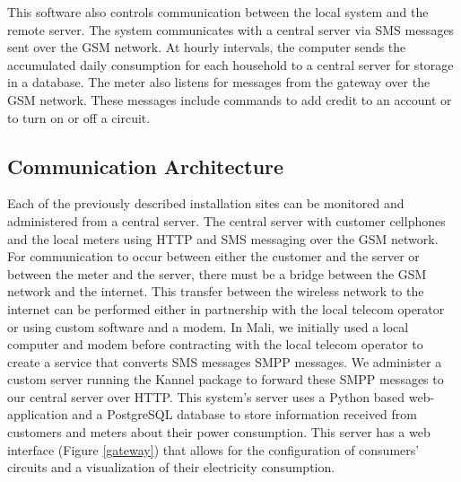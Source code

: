 \documentclass{sig-alternate}
\begin{document}
This software also controls communication between the local system and
the remote server.
The system communicates with a central server via SMS messages sent over
the GSM network.
At hourly intervals, the computer sends the accumulated daily
consumption for each household to a central server for storage in a
database.
The meter also listens for messages from the gateway over the GSM network.
These messages include commands to add credit to an account or to turn
on or off a circuit.

\subsection{Communication Architecture}
Each of the previously described installation sites can be monitored and
administered from a central server.
The central server with customer cellphones and the
local meters using HTTP and SMS messaging over the GSM
network.
For communication to occur between either the customer and the server
or between the meter and the server, there must be a bridge between
the GSM network and the internet.
This transfer between the wireless network to the internet can be
performed either in partnership with the local telecom operator or using
custom software and a modem.
In Mali, we initially used a local computer and modem before contracting
with the local telecom operator to create a service that converts
SMS messages SMPP messages.
We administer a custom server running the Kannel package to forward
these SMPP messages to our central server over HTTP.
This system's server uses a Python based web-application and a
PostgreSQL database to store information received from customers and
meters about their power consumption.
This server has a web interface (Figure \ref{gateway}) that allows for
the configuration of consumers' circuits and a visualization of their
electricity consumption.

\end{document}

